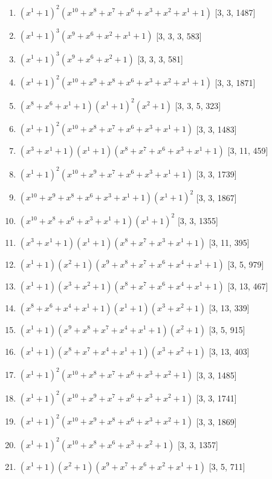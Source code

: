 \documentclass[10pt,twocolumn]{article}
\begin{document}
\begin{enumerate}
\item $(x^{1} + 1)^{2}(x^{10} + x^{8} + x^{7} + x^{6} + x^{3} + x^{2} + x^{1} + 1)$  [3, 3, 1487]
\item $(x^{1} + 1)^{3}(x^{9} + x^{6} + x^{2} + x^{1} + 1)$  [3, 3, 3, 583]
\item $(x^{1} + 1)^{3}(x^{9} + x^{6} + x^{2} + 1)$  [3, 3, 3, 581]
\item $(x^{1} + 1)^{2}(x^{10} + x^{9} + x^{8} + x^{6} + x^{3} + x^{2} + x^{1} + 1)$  [3, 3, 1871]
\item $(x^{8} + x^{6} + x^{1} + 1)(x^{1} + 1)^{2}(x^{2} + 1)$  [3, 3, 5, 323]
\item $(x^{1} + 1)^{2}(x^{10} + x^{8} + x^{7} + x^{6} + x^{3} + x^{1} + 1)$  [3, 3, 1483]
\item $(x^{3} + x^{1} + 1)(x^{1} + 1)(x^{8} + x^{7} + x^{6} + x^{3} + x^{1} + 1)$  [3, 11, 459]
\item $(x^{1} + 1)^{2}(x^{10} + x^{9} + x^{7} + x^{6} + x^{3} + x^{1} + 1)$  [3, 3, 1739]
\item $(x^{10} + x^{9} + x^{8} + x^{6} + x^{3} + x^{1} + 1)(x^{1} + 1)^{2}$  [3, 3, 1867]
\item $(x^{10} + x^{8} + x^{6} + x^{3} + x^{1} + 1)(x^{1} + 1)^{2}$  [3, 3, 1355]
\item $(x^{3} + x^{1} + 1)(x^{1} + 1)(x^{8} + x^{7} + x^{3} + x^{1} + 1)$  [3, 11, 395]
\item $(x^{1} + 1)(x^{2} + 1)(x^{9} + x^{8} + x^{7} + x^{6} + x^{4} + x^{1} + 1)$  [3, 5, 979]
\item $(x^{1} + 1)(x^{3} + x^{2} + 1)(x^{8} + x^{7} + x^{6} + x^{4} + x^{1} + 1)$  [3, 13, 467]
\item $(x^{8} + x^{6} + x^{4} + x^{1} + 1)(x^{1} + 1)(x^{3} + x^{2} + 1)$  [3, 13, 339]
\item $(x^{1} + 1)(x^{9} + x^{8} + x^{7} + x^{4} + x^{1} + 1)(x^{2} + 1)$  [3, 5, 915]
\item $(x^{1} + 1)(x^{8} + x^{7} + x^{4} + x^{1} + 1)(x^{3} + x^{2} + 1)$  [3, 13, 403]
\item $(x^{1} + 1)^{2}(x^{10} + x^{8} + x^{7} + x^{6} + x^{3} + x^{2} + 1)$  [3, 3, 1485]
\item $(x^{1} + 1)^{2}(x^{10} + x^{9} + x^{7} + x^{6} + x^{3} + x^{2} + 1)$  [3, 3, 1741]
\item $(x^{1} + 1)^{2}(x^{10} + x^{9} + x^{8} + x^{6} + x^{3} + x^{2} + 1)$  [3, 3, 1869]
\item $(x^{1} + 1)^{2}(x^{10} + x^{8} + x^{6} + x^{3} + x^{2} + 1)$  [3, 3, 1357]
\item $(x^{1} + 1)(x^{2} + 1)(x^{9} + x^{7} + x^{6} + x^{2} + x^{1} + 1)$  [3, 5, 711]

\end{enumerate}
\end{document}
